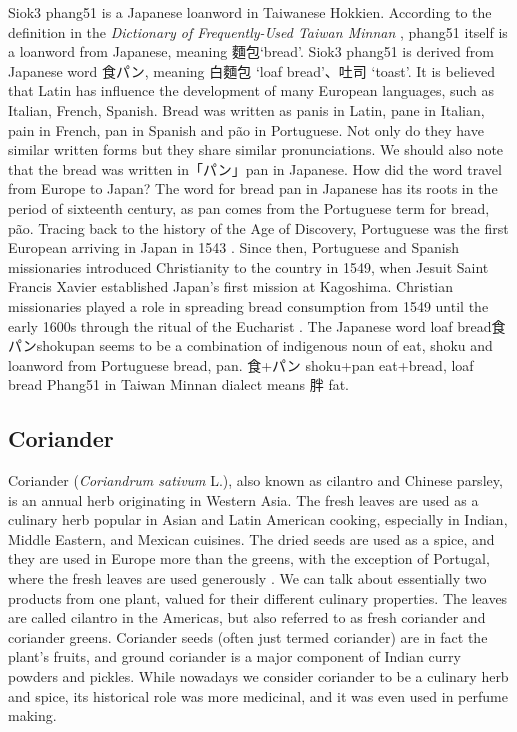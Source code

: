 \documentclass[12pt]{article}
\begin{document}
Siok3 phang51 is a Japanese loanword in Taiwanese Hokkien. According to the definition in the \textit{Dictionary of Frequently-Used Taiwan Minnan} \parencite{ministry_of_education__2011}, phang51 itself is a loanword from Japanese, meaning 麵包‘bread’. Siok3 phang51 is derived from Japanese word 食パン, meaning 白麵包 ‘loaf bread’、吐司 ‘toast’. It is believed that Latin has influence the development of many European languages, such as Italian, French, Spanish. Bread was written as panis in Latin, pane in Italian, pain in French, pan in Spanish and pão in Portuguese. Not only do they have similar written forms but they share similar pronunciations. We should also note that the bread was written in「パン」pan in Japanese. How did the word travel from Europe to Japan?
The word for bread pan in Japanese has its roots in the period of sixteenth century, as pan comes from the Portuguese term for bread, pão. Tracing back to the history of the Age of Discovery, Portuguese was the first European arriving in Japan in 1543 \parencite{peters_bread_2017}. Since then, Portuguese and Spanish missionaries introduced Christianity to the country in 1549, when Jesuit Saint Francis Xavier established Japan’s first mission at Kagoshima. Christian missionaries played a role in spreading bread consumption from 1549 until the early 1600s through the ritual of the Eucharist \parencite{sheng_forging_2017}.
The Japanese word loaf bread食パンshokupan seems to be a combination of indigenous noun of eat, shoku and loanword from Portuguese bread, pan.
食+パン
shoku+pan
eat+bread, loaf bread
Phang51 in Taiwan Minnan dialect means 胖 fat.  

\subsection{Coriander}

Coriander (\textit{Coriandrum sativum} L.), also known as cilantro and Chinese parsley, is an annual herb originating in Western Asia. The fresh leaves are used as a culinary herb popular in Asian and Latin American cooking, especially in Indian, Middle Eastern, and Mexican cuisines. The dried seeds are used as a spice, and they are used in Europe more than the greens, with the exception of Portugal, where the fresh leaves are used generously \parencite{davidson_oxford_2014}. We can talk about essentially two products from one plant, valued for their different culinary properties. The leaves are called cilantro in the Americas, but also referred to as fresh coriander and coriander greens. Coriander seeds (often just termed coriander) are in fact the plant’s fruits, and ground coriander is a major component of Indian curry powders and pickles. While nowadays we consider coriander to be a culinary herb and spice, its historical role was more medicinal, and it was even used in perfume making.
\end{document}
